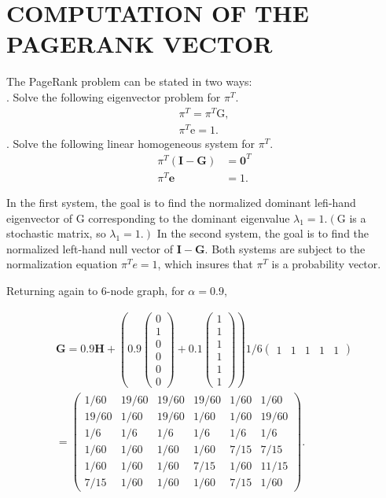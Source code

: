 \section{COMPUTATION OF THE PAGERANK VECTOR}

The PageRank problem can be stated in two ways:\\
. Solve the following eigenvector problem for $\pi^{T}$.
$$
\begin{array}{r}
	\pi^{T}=\pi^{T} \mathrm{G}, \\
	\pi^{T} \mathrm{e}=1 .
\end{array}
$$
. Solve the following linear homogeneous system for $\pi^{T}$.
$$
\begin{aligned}
	\pi^{T}(\mathbf{I}-\mathbf{G}) &=\mathbf{0}^{T} \\
	\pi^{T} \mathbf{e} &=1 .
\end{aligned}
$$

\noindent In the first system, the goal is to find the normalized dominant lefi-hand eigenvector of $\mathrm{G}$ corresponding to the dominant eigenvalue $\lambda_{1}=1 .\left(\mathrm{G}\right.$ is a stochastic matrix, so $\left.\lambda_{1}=1 .\right)$ In the second system, the goal is to find the normalized left-hand null vector of $\mathbf{I}-\mathbf{G}$. Both systems are subject to the normalization equation $\pi^{T} e=1$, which insures that $\pi^{T}$ is a probability vector.
	
\noindent Returning again to 6-node graph, for $\alpha=0.9$,
	
$$
\begin{aligned}
	\mathbf{G}=0.9 \mathbf{H}+\left(0.9\left(\begin{array}{l}
		0 \\
		1 \\
		0 \\
		0 \\
		0 \\
		0
\end{array}\right)+0.1\left(\begin{array}{l}
		1 \\
		1 \\
		1 \\
		1 \\
		1 \\
		1
\end{array}\right)\right) 1 / 6\left(\begin{array}{llllll}
		1 & 1 & 1 & 1 & 1
		\end{array}\right) \\
		=\left(\begin{array}{cccccc}
		1 / 60 & 19 / 60 & 19 / 60 & 19 / 60 & 1 / 60 & 1 / 60 \\
		19 / 60 & 1 / 60 & 19 / 60 & 1 / 60 & 1 / 60 & 19 / 60 \\
		1 / 6 & 1 / 6 & 1 / 6 & 1 / 6 & 1 / 6 & 1 / 6 \\
		1 / 60 & 1 / 60 & 1 / 60 & 1 / 60 & 7 / 15 & 7 / 15 \\
		1 / 60 & 1 / 60 & 1 / 60 & 7 / 15 & 1 / 60 & 11 / 15 \\
		7 / 15 & 1 / 60 & 1 / 60 & 1 / 60 & 7 / 15 & 1 / 60
    \end{array}\right) .
\end{aligned}
$$


